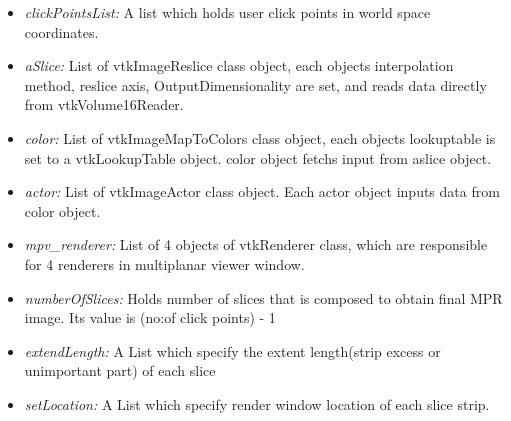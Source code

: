 \documentclass[12pt]{report}
\begin{document}
\begin{itemize}
\item 
\textit{clickPointsList:} A list which holds user click points in world space coordinates.   \\
\item
\textit{aSlice:} List of vtkImageReslice class object, each objects  interpolation method, reslice axis, OutputDimensionality are set, and reads data directly from vtkVolume16Reader. \\
\item
\textit{color:} List of vtkImageMapToColors class object, each objects lookuptable is set to a vtkLookupTable object. color object fetchs input from aslice object.\\
\item
\textit{actor:} List of vtkImageActor class object. Each actor object inputs data from color object.  \\
\item
\textit{mpv\_renderer:} List of 4 objects of vtkRenderer class, which are responsible for 4 renderers in multiplanar viewer window. \\
\item
\textit{numberOfSlices:} Holds number of slices that is composed to obtain final MPR image. Its value is  (no:of click points) - 1 \\
\item
\textit{extendLength:} A List which specify the extent length(strip excess or unimportant part) of each slice \\ 
\item
\textit{setLocation:} A List which specify render window location of each slice strip.

\end{itemize}
\end{document}
